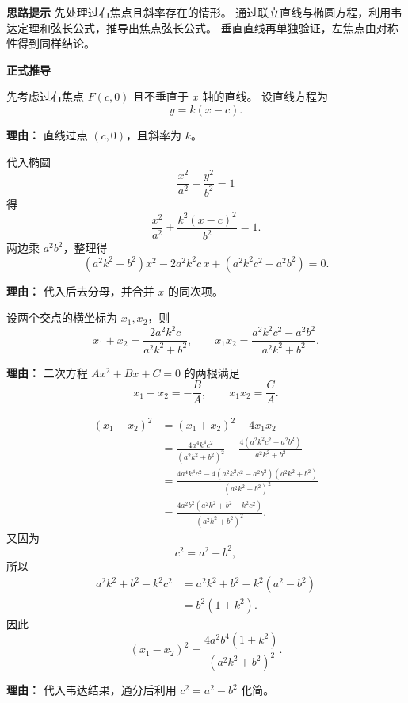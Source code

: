 \begin{proofbox}
	\textbf{\textcolor{CProof}{思路提示}}
	先处理过右焦点且斜率存在的情形。
	通过联立直线与椭圆方程，利用韦达定理和弦长公式，推导出焦点弦长公式。
	垂直直线再单独验证，左焦点由对称性得到同样结论。

	\medskip

	\textbf{\textcolor{CProof}{正式推导}}

	\begin{description}[style=nextline, leftmargin=2.8em, labelsep=0.5em, itemsep=0.55em]
		\item[\textbf{步骤一（设直线方程）：}]
		      先考虑过右焦点 $F(c,0)$ 且不垂直于 $x$ 轴的直线。
		      设直线方程为
		      \[
			      y=k(x-c).
		      \]
		      \par\textbf{理由：}
		      直线过点 $(c,0)$，且斜率为 $k$。

		\item[\textbf{步骤二（联立椭圆）：}]
		      代入椭圆
		      \[
			      \frac{x^2}{a^2}+\frac{y^2}{b^2}=1
		      \]
		      得
		      \[
			      \frac{x^2}{a^2}+\frac{k^2(x-c)^2}{b^2}=1.
		      \]
		      两边乘 $a^2b^2$，整理得
		      \[
			      (a^2k^2+b^2)x^2-2a^2k^2c\,x+(a^2k^2c^2-a^2b^2)=0.
		      \]
		      \par\textbf{理由：}
		      代入后去分母，并合并 $x$ 的同次项。

		\item[\textbf{步骤三（韦达定理）：}]
		      设两个交点的横坐标为 $x_1,x_2$，则
		      \[
			      x_1+x_2=\frac{2a^2k^2c}{a^2k^2+b^2},
			      \qquad
			      x_1x_2=\frac{a^2k^2c^2-a^2b^2}{a^2k^2+b^2}.
		      \]
		      \par\textbf{理由：}
		      二次方程 $Ax^2+Bx+C=0$ 的两根满足
		      \[
			      x_1+x_2=-\frac BA,\qquad x_1x_2=\frac CA.
		      \]

		\item[\textbf{步骤四（计算 $|x_1-x_2|^2$）：}]
		      \[
			      \begin{aligned}
				      (x_1-x_2)^2
				       & = (x_1+x_2)^2-4x_1x_2                               \\[0.3em]
				       & = \frac{4a^4k^4c^2}{(a^2k^2+b^2)^2}
				      -\frac{4(a^2k^2c^2-a^2b^2)}{a^2k^2+b^2}                \\[0.3em]
				       & = \frac{4a^4k^4c^2-4(a^2k^2c^2-a^2b^2)(a^2k^2+b^2)}
				      {(a^2k^2+b^2)^2}                                       \\[0.3em]
				       & = \frac{4a^2b^2(a^2k^2+b^2-k^2c^2)}
				      {(a^2k^2+b^2)^2}.
			      \end{aligned}
		      \]
		      又因为
		      \[
			      c^2=a^2-b^2,
		      \]
		      所以
		      \[
			      \begin{aligned}
				      a^2k^2+b^2-k^2c^2
				       & =a^2k^2+b^2-k^2(a^2-b^2) \\
				       & =b^2(1+k^2).
			      \end{aligned}
		      \]
		      因此
		      \[
			      (x_1-x_2)^2
			      =
			      \frac{4a^2b^4(1+k^2)}{(a^2k^2+b^2)^2}.
		      \]
		      \par\textbf{理由：}
		      代入韦达结果，通分后利用 $c^2=a^2-b^2$ 化简。


\end{description}
\end{proofbox}
